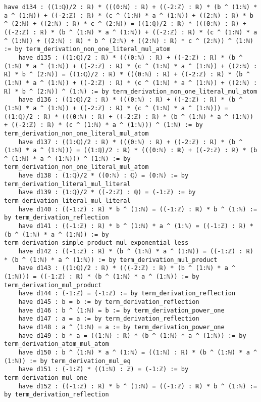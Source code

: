 \documentclass{article}
\begin{document}
\begin{tcolorbox}[colback=white!10, width=\linewidth]
\begin{lstlisting}[language=Lean4]
    have d134 : ((1:ℚ)/2 : ℝ) * (((0:ℕ) : ℝ) + ((-2:ℤ) : ℝ) * (b ^ (1:ℕ) * a ^ (1:ℕ)) + ((-2:ℤ) : ℝ) * (c ^ (1:ℕ) * a ^ (1:ℕ)) + ((2:ℕ) : ℝ) * b ^ (2:ℕ) + ((2:ℕ) : ℝ) * c ^ (2:ℕ)) = ((1:ℚ)/2 : ℝ) * (((0:ℕ) : ℝ) + ((-2:ℤ) : ℝ) * (b ^ (1:ℕ) * a ^ (1:ℕ)) + ((-2:ℤ) : ℝ) * (c ^ (1:ℕ) * a ^ (1:ℕ)) + ((2:ℕ) : ℝ) * b ^ (2:ℕ) + ((2:ℕ) : ℝ) * c ^ (2:ℕ)) ^ (1:ℕ) := by term_derivation_non_one_literal_mul_atom
    have d135 : ((1:ℚ)/2 : ℝ) * (((0:ℕ) : ℝ) + ((-2:ℤ) : ℝ) * (b ^ (1:ℕ) * a ^ (1:ℕ)) + ((-2:ℤ) : ℝ) * (c ^ (1:ℕ) * a ^ (1:ℕ)) + ((2:ℕ) : ℝ) * b ^ (2:ℕ)) = ((1:ℚ)/2 : ℝ) * (((0:ℕ) : ℝ) + ((-2:ℤ) : ℝ) * (b ^ (1:ℕ) * a ^ (1:ℕ)) + ((-2:ℤ) : ℝ) * (c ^ (1:ℕ) * a ^ (1:ℕ)) + ((2:ℕ) : ℝ) * b ^ (2:ℕ)) ^ (1:ℕ) := by term_derivation_non_one_literal_mul_atom
    have d136 : ((1:ℚ)/2 : ℝ) * (((0:ℕ) : ℝ) + ((-2:ℤ) : ℝ) * (b ^ (1:ℕ) * a ^ (1:ℕ)) + ((-2:ℤ) : ℝ) * (c ^ (1:ℕ) * a ^ (1:ℕ))) = ((1:ℚ)/2 : ℝ) * (((0:ℕ) : ℝ) + ((-2:ℤ) : ℝ) * (b ^ (1:ℕ) * a ^ (1:ℕ)) + ((-2:ℤ) : ℝ) * (c ^ (1:ℕ) * a ^ (1:ℕ))) ^ (1:ℕ) := by term_derivation_non_one_literal_mul_atom
    have d137 : ((1:ℚ)/2 : ℝ) * (((0:ℕ) : ℝ) + ((-2:ℤ) : ℝ) * (b ^ (1:ℕ) * a ^ (1:ℕ))) = ((1:ℚ)/2 : ℝ) * (((0:ℕ) : ℝ) + ((-2:ℤ) : ℝ) * (b ^ (1:ℕ) * a ^ (1:ℕ))) ^ (1:ℕ) := by term_derivation_non_one_literal_mul_atom
    have d138 : (1:ℚ)/2 * ((0:ℕ) : ℚ) = (0:ℕ) := by term_derivation_literal_mul_literal
    have d139 : (1:ℚ)/2 * ((-2:ℤ) : ℚ) = (-1:ℤ) := by term_derivation_literal_mul_literal
    have d140 : ((-1:ℤ) : ℝ) * b ^ (1:ℕ) = ((-1:ℤ) : ℝ) * b ^ (1:ℕ) := by term_derivation_reflection
    have d141 : ((-1:ℤ) : ℝ) * b ^ (1:ℕ) * a ^ (1:ℕ) = ((-1:ℤ) : ℝ) * (b ^ (1:ℕ) * a ^ (1:ℕ)) := by term_derivation_simple_product_mul_exponential_less
    have d142 : ((-1:ℤ) : ℝ) * (b ^ (1:ℕ) * a ^ (1:ℕ)) = ((-1:ℤ) : ℝ) * (b ^ (1:ℕ) * a ^ (1:ℕ)) := by term_derivation_mul_product
    have d143 : ((1:ℚ)/2 : ℝ) * (((-2:ℤ) : ℝ) * (b ^ (1:ℕ) * a ^ (1:ℕ))) = ((-1:ℤ) : ℝ) * (b ^ (1:ℕ) * a ^ (1:ℕ)) := by term_derivation_mul_product
    have d144 : (-1:ℤ) = (-1:ℤ) := by term_derivation_reflection
    have d145 : b = b := by term_derivation_reflection
    have d146 : b ^ (1:ℕ) = b := by term_derivation_power_one
    have d147 : a = a := by term_derivation_reflection
    have d148 : a ^ (1:ℕ) = a := by term_derivation_power_one
    have d149 : b * a = ((1:ℕ) : ℝ) * (b ^ (1:ℕ) * a ^ (1:ℕ)) := by term_derivation_atom_mul_atom
    have d150 : b ^ (1:ℕ) * a ^ (1:ℕ) = ((1:ℕ) : ℝ) * (b ^ (1:ℕ) * a ^ (1:ℕ)) := by term_derivation_mul_eq
    have d151 : (-1:ℤ) * ((1:ℕ) : ℤ) = (-1:ℤ) := by term_derivation_mul_one
    have d152 : ((-1:ℤ) : ℝ) * b ^ (1:ℕ) = ((-1:ℤ) : ℝ) * b ^ (1:ℕ) := by term_derivation_reflection

\end{lstlisting}
\end{tcolorbox}
\end{document}
